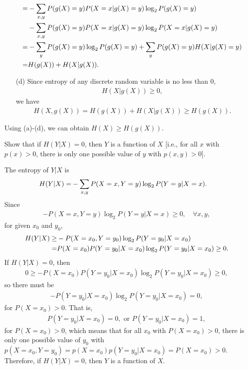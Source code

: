 \documentclass{assignment}
\begin{document}
\begin{pf}
\begin{itemize}
\begin{align}
            \notag=&-\sum_{x,y}P(g(X)=y)P(X=x\vert g(X)=y)\log_2P(g(X)=y)\\
            \notag&-\sum_{x,y}P(g(X)=y)P(X=x\vert g(X)=y)\log_2P(X=x\vert g(X)=y)\\
            \notag=&-\sum_yP(g(X)=y)\log_2P(g(X)=y)+\sum_yP(g(X)=y)H(X\vert g(X)=y)\\
            \notag=&H(g(X))+H(X\vert g(X)).
        \end{align}
        \item[(d)] Since entropy of any discrete random variable is no less than $0$,
        \begin{align}
            H(X\vert g(X))\geq 0,
        \end{align}
        we have
        \begin{align}
            H(X,g(X))=H(g(X))+H(X\vert g(X))\geq H(g(X)).
        \end{align}
    \end{itemize}
    Using (a)-(d), we can obtain $H(X)\geq H(g(X))$.
\end{pf}

\begin{prob}
    Show that if $H(Y\vert X)=0$, then $Y$ is a function of $X$ [i.e., for all $x$ with $p(x)>0$, there is only one possible value of $y$ with $p(x,y)>0$].
\end{prob}
\begin{pf}
    The entropy of $Y\vert X$ is
    \begin{align}
        \notag H(Y\vert X)=&-\sum_{x,y}P(X=x,Y=y)\log_2P(Y=y\vert X=x).
    \end{align}
    Since
    \begin{align}
        -P(X=x,Y=y)\log_2P(Y=y\vert X=x)\geq 0,\quad\forall x,y,
    \end{align}
    for given $x_0$ and $y_0$,
    \begin{align}
        \notag H(Y\vert X)\geq&-P(X=x_0,Y=y_0)\log_2P(Y=y_0\vert X=x_0)\\
        =&P(X=x_0)P(Y=y_0\vert X=x_0)\log_2P(Y=y_0\vert X=x_0)\geq 0.
    \end{align}
    If $H(Y\vert X)=0$, then
    \begin{align}
        0\geq-P(X=x_0)P(Y=y_0\vert X=x_0)\log_2P(Y=y_0\vert X=x_0)\geq 0,
    \end{align}
    so there must be
    \begin{align}
        -P(Y=y_0\vert X=x_0)\log_2P(Y=y_0\vert X=x_0)=0,
    \end{align}
    for $P(X=x_0)>0$.
    That is,
    \begin{align}
        P(Y=y_0\vert X=x_0)=0,\text{ or }P(Y=y_0\vert X=x_0)=1,
    \end{align}
    for $P(X=x_0)>0$, which means that for all $x_0$ with $P(X=x_0)>0$, there is only one possible value of $y_0$ with $p(X=x_0,Y=y_0)=p(X=x_0)p(Y=y_0\vert X=x_0)=P(X=x_0)>0$.\\
    Therefore, if $H(Y\vert X)=0$, then $Y$ is a function of $X$.
\end{pf}
\end{document}
